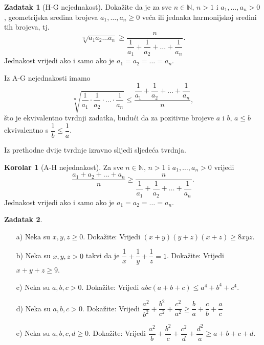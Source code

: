 \documentclass{book}
\renewenvironment{proof}{%
    \vspace{-\parskip}\begin{oldproof}%
    }{%
    \end{oldproof}%
}
\theoremstyle{definition}
\newtheorem{corollary}{Korolar}
\theoremstyle{definition}
\newtheorem{exercise}{Zadatak}
\theoremstyle{remark}
\begin{document}
\begin{exercise}[H-G nejednakost]
Dokažite da je za sve $n\in \mathbb{N}$, $n>1$ i $a_1, \dots, a_n> 0$, geometrijska sredina brojeva $a_1, \dots, a_n\geq 0$ veća ili jednaka harmonijskoj sredini tih brojeva, tj.
$$\sqrt[n]{a_1a_2\dots a_n}\geq \dfrac{n}{\dfrac{1}{a_1}+\dfrac{1}{a_2}+\dots+\dfrac{1}{a_n}}.$$
Jednakost vrijedi ako i samo ako je $a_1=a_2=\dots=a_n$.
\end{exercise}
\begin{proof}[Rješenje]
Iz A-G nejednakosti imamo
$$\sqrt[n]{\dfrac{1}{a_1}\cdot \dfrac{1}{a_2}\cdot ...\cdot \dfrac{1}{a_n}}\leq \dfrac{\dfrac{1}{a_1}+\dfrac{1}{a_2}+\dots+\dfrac{1}{a_n}}{n},$$
što je ekvivalentno tvrdnji zadatka, budući da za pozitivne brojeve $a$ i $b$, $a\leq b$ ekvivalentno s $\dfrac{1}{b}\leq \dfrac{1}{a}$.
\end{proof}
\noindent Iz prethodne dvije tvrdnje izravno slijedi sljedeća tvrdnja.
\begin{corollary}[A-H nejednakost]
Za sve $n\in \mathbb{N}$, $n>1$ i $a_1, \dots, a_n> 0$ vrijedi
$$\dfrac{a_1+a_2+\dots+a_n}{n}\geq \dfrac{n}{\dfrac{1}{a_1}+\dfrac{1}{a_2}+\dots+\dfrac{1}{a_n}}.$$
Jednakost vrijedi ako i samo ako je $a_1=a_2=\dots=a_n$.
\end{corollary}
\begin{exercise}\textbf{}
\begin{itemize}
\item[a)] Neka su $x, y, z\geq 0$. Dokažite: Vrijedi $(x+y)(y+z)(x+z)\geq 8xyz$.
\item[b)] Neka su $x, y, z> 0$ takvi da je $\dfrac{1}{x}+\dfrac{1}{y}+\dfrac{1}{z}=1$. Dokažite: Vrijedi $x+y+z\geq 9$.
\item[c)] Neka su $a, b, c> 0$. Dokažite: Vrijedi
$abc(a+b+c)\leq a^4+b^4+c^4$.
\item[d)] Neka su $a, b, c> 0$. Dokažite: Vrijedi
$\dfrac{a^2}{b^2}+\dfrac{b^2}{c^2}+\dfrac{c^2}{a^2}\geq \dfrac{b}{a}+\dfrac{c}{b}+\dfrac{a}{c}$
\item[e)] Neka su $a, b, c, d\geq 0$. Dokažite: Vrijedi
$\dfrac{a^2}{b}+\dfrac{b^2}{c}+\dfrac{c^2}{d}+\dfrac{d^2}{a}\geq a+b+c+d$.
\end{itemize}
\end{exercise}
\end{document}
